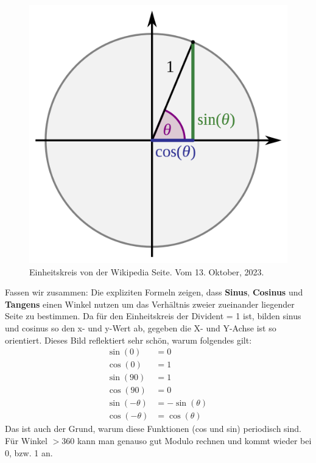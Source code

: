 \documentclass[letterpaper, titlepage]{article}
\begin{document}
 \begin{figure}[h]
    \begin{center}    
        \includegraphics[scale=0.32]{Bilder/Sinus_und_Kosinus_am_Einheitskreis_1.svg.png}
        \caption[short]{Einheitskreis von der Wikipedia Seite. Vom 13. Oktober, 2023.}
    \end{center}
    \label{Einheitskreis_Bild}
\end{figure} \hfill \break
Fassen wir zusammen: Die expliziten Formeln zeigen, dass \textbf{Sinus}, \textbf{Cosinus} und \textbf{Tangens} einen Winkel nutzen um das Verhältnis zweier zueinander liegender Seite zu bestimmen. Da für den Einheitskreis der Divident = 1 ist, bilden sinus und cosinus so den x- und y-Wert ab, gegeben die X- und Y-Achse ist so orientiert. Dieses Bild reflektiert sehr schön, warum folgendes gilt:
\skiptwolines
\begin{align*}
    \sin(0) &= 0 \
    \\
    \cos(0) &= 1 \
    \\
    \sin(90) &= 1 \
    \\
    \cos(90) &= 0 \
    \\
    \sin(-\theta) &=  -\sin(\theta) \
    \\
    \cos(-\theta) &= \cos(\theta)
\end{align*}
Das ist auch der Grund, warum diese Funktionen (cos und sin) periodisch sind. Für Winkel $> 360$ kann man genauso gut Modulo rechnen und kommt wieder bei 0, bzw. 1 an.
\end{document}
